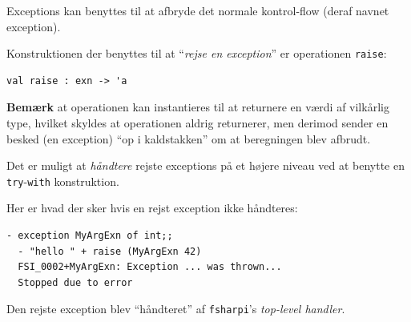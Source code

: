 \documentclass[rgb]{beamer}
\begin{document}
\begin{frame}[fragile]
\begin{footnotesize}


  Exceptions kan benyttes til at afbryde det normale kontrol-flow (deraf navnet exception).

  \vspace{2ex}

  Konstruktionen der benyttes til at ``\emph{rejse en exception}'' er
  operationen \lstinline{raise}:

\begin{lstlisting}[numbers=none,frame=none,mathescape]
  val raise : exn -> 'a
\end{lstlisting}

\textbf{Bemærk} at operationen kan instantieres til at returnere en værdi af
vilkårlig type, hvilket skyldes at operationen aldrig returnerer, men
derimod sender en besked (en exception) ``op i kaldstakken'' om at
beregningen blev afbrudt.

\vspace{2ex}

Det er muligt at \emph{håndtere} rejste exceptions på et højere niveau
ved at benytte en \lstinline{try}-\lstinline{with} konstruktion.

\vspace{2ex}

Her er hvad der sker hvis en rejst exception ikke håndteres:
\begin{lstlisting}[numbers=none,frame=none,mathescape]
  - exception MyArgExn of int;;
  - "hello " + raise (MyArgExn 42)
  FSI_0002+MyArgExn: Exception ... was thrown...
  Stopped due to error
\end{lstlisting}

Den rejste exception blev ``håndteret'' af \lstinline{fsharpi}'s \emph{top-level handler}.
\end{footnotesize}
\end{frame}
\end{document}
